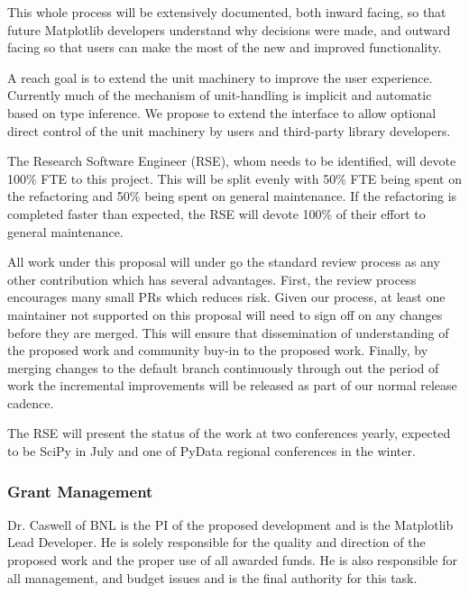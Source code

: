 \documentclass[12pt]{article}
\numberwithin{page}{section}
\begin{document}
This whole process will be extensively documented, both inward facing,
so that future Matplotlib developers understand why decisions were
made, and outward facing so that users can make the most of the new
and improved functionality.



A reach goal is to extend the unit machinery to improve the user
experience.  Currently much of the mechanism of unit-handling is
implicit and automatic based on type inference.  We propose to extend
the interface to allow optional direct control of the unit machinery
by users and third-party library developers.


The Research Software Engineer (RSE), whom needs to be identified,
will devote 100\% FTE to this project.  This will be split evenly with
50\% FTE being spent on the refactoring and 50\% being spent on
general maintenance.  If the refactoring is completed faster than
expected, the RSE will devote 100\% of their effort to general
maintenance.


All work under this proposal will under go the standard review process
as any other contribution which has several advantages.  First, the
review process encourages many small PRs which reduces risk.  Given
our process, at least one maintainer not supported on this proposal will
need to sign off on any changes before they are merged.  This will
ensure that dissemination of understanding of the proposed work and
community buy-in to the proposed work.  Finally, by merging changes to
the default branch continuously through out the period of work the
incremental improvements will be released as part of our normal
release cadence.

The RSE will present the status of the work at two conferences yearly,
expected to be SciPy in July and one of PyData regional conferences in
the winter.






\subsubsection{Grant Management}

Dr. Caswell of BNL is the PI of the proposed development and is the
Matplotlib Lead Developer.  He is solely responsible for the quality
and direction of the proposed work and the proper use of all awarded
funds.  He is also responsible for all management, and budget issues
and is the final authority for this task.
\end{document}
